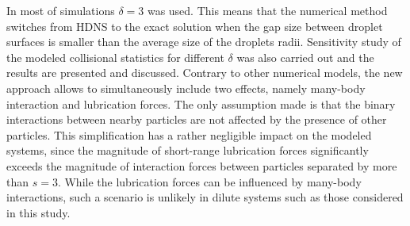 \documentclass[../thesis.tex]{subfiles}
\begin{document}
In most of simulations $\delta=3$ was used. This means that the numerical method switches from HDNS to the exact solution when the gap size between droplet surfaces is smaller than the average size of the droplets radii. Sensitivity study of the modeled collisional statistics for different $\delta$ was also carried out and the results are presented and discussed. Contrary to other numerical models, the new approach allows to simultaneously include two effects, namely many-body interaction and lubrication forces. The only assumption made is that the binary interactions between nearby particles are not affected by the presence of other particles. This simplification has a rather negligible impact on the modeled systems, since the magnitude of short-range lubrication forces significantly exceeds the magnitude of interaction forces between particles separated by more than $s = 3$. While the lubrication forces can be influenced by many-body interactions, such a scenario is unlikely in dilute systems such as those considered in this study.
\end{document}
